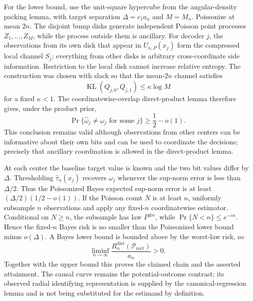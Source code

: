 For the lower bound, use the unit-square hypercube from the angular-density packing lemma, with target separation \(\Delta=c_1a_n\) and \(M=M_n\).  Poissonize at mean \(2n\).  The disjoint bump disks generate independent Poisson point processes \(Z_1,\ldots,Z_M\), while the process outside them is ancillary.  For decoder \(j\), the observations from its own disk that appear in \(U_{n,P}(x_j)\) form the compressed local channel \(S_j\); everything from other disks is arbitrary cross-coordinate side information.  Restriction to the local disk cannot increase relative entropy.  The construction was chosen with slack so that the mean-\(2n\) channel satisfies
\[
\operatorname{KL}(Q_{j,0},Q_{j,1})\leq\kappa\log M
\]
for a fixed \(\kappa<1\).  The coordinatewise-overlap direct-product lemma therefore gives, under the product prior,
\[
\Pr\{\widehat\omega_j\neq\omega_j\text{ for some }j\}\geq\frac12-o(1).
\]
This conclusion remains valid although observations from other centers can be informative about their own bits and can be used to coordinate the decisions; precisely that ancillary coordination is allowed in the direct-product lemma.

At each center the baseline target value is known and the two bit values differ by \(\Delta\).  Thresholding \(\widehat\tau_n(x_j)\) recovers \(\omega_j\) whenever the sup-norm error is less than \(\Delta/2\).  Thus the Poissonized Bayes expected sup-norm error is at least \((\Delta/2)(1/2-o(1))\).  If the Poisson count \(N\) is at least \(n\), uniformly subsample \(n\) observations and apply any fixed-\(n\) coordinatewise estimator.  Conditional on \(N\geq n\), the subsample has law \(P^{\otimes n}\), while \(\Pr\{N<n\}\leq e^{-cn}\).  Hence the fixed-\(n\) Bayes risk is no smaller than the Poissonized lower bound minus \(o(\Delta)\).  A Bayes lower bound is bounded above by the worst-law risk, so
\[
\liminf_{n\to\infty}
\frac{R_n^{\mathrm{dist}}(\mathcal P_{\mathrm{rect}})}{a_n}>0.
\]
Together with the upper bound this proves the claimed chain and the asserted attainment.  The causal curve remains the potential-outcome contrast; its observed radial identifying representation is supplied by the canonical-regression lemma and is not being substituted for the estimand by definition.